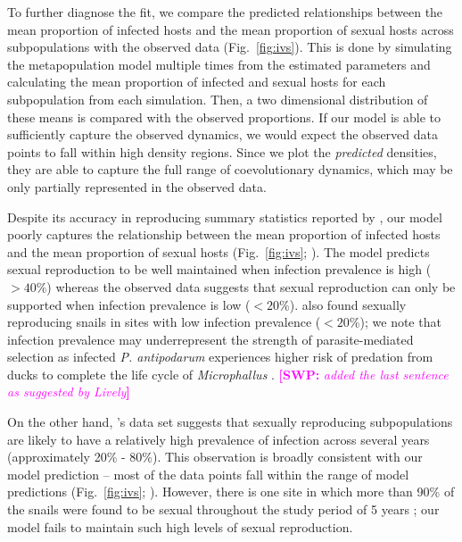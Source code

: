 \documentclass{article}\usepackage[]{graphicx}\usepackage[]{color}
\newcommand{\comment}[3]{\textcolor{#1}{\textbf{[#2: }\textit{#3}\textbf{]}}}
\newcommand{\swp}[1]{\comment{magenta}{SWP}{#1}}
\newcommand{\citetapos}[1]{\citeauthor{#1}'s \citeyearpar{#1}}
\newcommand{\fref}[1]{Fig.~\ref{fig:#1}}
\begin{document}
To further diagnose the fit, we compare the predicted relationships between the mean proportion of infected hosts and the mean proportion of sexual hosts across subpopulations with the observed data (\fref{ivs}).
This is done by simulating the metapopulation model multiple times from the estimated parameters and calculating the mean proportion of infected and sexual hosts for each subpopulation from each simulation.
Then, a two dimensional distribution of these means is compared with the observed proportions.
If our model is able to sufficiently capture the observed dynamics, we would expect the observed data points to fall within high density regions.
Since we plot the \emph{predicted} densities, they are able to capture the full range of coevolutionary dynamics, which may be only partially represented in the observed data.

Despite its accuracy in reproducing summary statistics reported by \cite{dagan2013clonal}, 
our model poorly captures the relationship between the mean proportion of infected hosts and the mean proportion of sexual hosts (\fref{ivs}; \cite{dagan2013clonal}).
The model predicts sexual reproduction to be well maintained when infection prevalence is high ($> 40\%$) whereas
the observed data \citep{dagan2013clonal} suggests that sexual reproduction can only be supported when infection prevalence is low ($< 20\%$).
\cite{mckone2016fine} also found sexually reproducing snails in sites with low infection prevalence ($< 20\%$);
we note that infection prevalence may underrepresent the strength of parasite-mediated selection as
infected \textit{P. antipodarum} experiences higher risk of predation from ducks to complete the life cycle of \textit{Microphallus} \citep{levri1996effects}.
\swp{added the last sentence as suggested by Lively}

On the other hand, \citetapos{vergara2014infection} data set suggests that sexually reproducing subpopulations are likely to have a relatively high prevalence of infection across several years (approximately 20\% - 80\%).
This observation is broadly consistent with our model prediction --  
most of the data points fall within the range of model predictions (\fref{ivs}; \cite{vergara2014infection}).
However, there is one site in which more than 90\% of the snails were found to be sexual throughout the study period of 5 years \citep{vergara2014infection};
our model fails to maintain such high levels of sexual reproduction.
\end{document}
